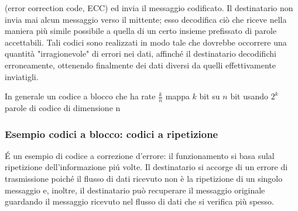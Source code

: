 \begin{itemize}
{{\begin{itemize}
{                            (error correction code, ECC) ed invia il messaggio codificato. Il destinatario non invia mai alcun 
                            messaggio verso il mittente; esso decodifica ciò che riceve nella maniera più simile possibile a quella di un 
                            certo insieme prefissato di parole accettabili. Tali codici sono realizzati in modo tale che dovrebbe occorrere 
                            una quantità "irragionevole" di errori nei dati, affinché il destinatario decodifichi erroneamente, ottenendo 
                            finalmente dei dati diversi da quelli effettivamente inviatigli.
                        } 
                    \end{itemize}
                    In generale un codice a blocco che ha rate $\frac{k}{n}$ mappa $k$ bit su $n$ bit usando $2^k$ parole di codice di dimensione n
                }}
            \end{itemize}

        \subsubsection{Esempio codici a blocco: codici a ripetizione}
            É un esempio di codice a correzione d'errore: il funzionamento si basa sulal ripetizione dell'informazione piú volte. Il destinatario
            si accorge di un errore di trasmissione poiché il flusso di dati ricevuto non è la ripetizione di un singolo messaggio e, inoltre, 
            il destinatario può recuperare il messaggio originale guardando il messaggio ricevuto nel flusso di dati che si verifica più spesso.

